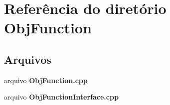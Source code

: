 \section{Referência do diretório Obj\+Function}
\label{dir_437f918657ea568c4e62e1b9fe38ab60}
\subsection*{Arquivos}
\begin{DoxyCompactItemize}
\item 
arquivo {\bf Obj\+Function.\+cpp}
\item 
arquivo {\bf Obj\+Function\+Interface.\+cpp}
\end{DoxyCompactItemize}
